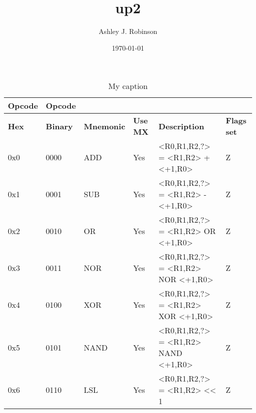 \documentclass[a4paper]{article}
\title{up2}
\author{Ashley J. Robinson}
\date{\today}
\begin{document}
\maketitle

\section{}

\begin{table}[]
    \centering
    \caption{My caption}
    \label{my-label}
    \begin{tabular}{|l|l|l|l|l|l|}
        \hline
        \textbf{Opcode}     &   \textbf{Opcode} &                       &                       &                                           &                           \\ \hline  
        \textbf{Hex}        &   \textbf{Binary} &   \textbf{Mnemonic}   &   \textbf{Use MX}     &   \textbf{Description}                    &   \textbf{Flags set}      \\ \hline  
        0x0                 &   0000            &   ADD                 &   Yes                 &   <R0,R1,R2,?> = <R1,R2> + <+1,R0>        &   Z                       \\ \hline  
        0x1                 &   0001            &   SUB                 &   Yes                 &   <R0,R1,R2,?> = <R1,R2> - <+1,R0>        &   Z                       \\ \hline  
        0x2                 &   0010            &   OR                  &   Yes                 &   <R0,R1,R2,?> = <R1,R2> OR <+1,R0>       &   Z                       \\ \hline  
        0x3                 &   0011            &   NOR                 &   Yes                 &   <R0,R1,R2,?> = <R1,R2> NOR <+1,R0>      &   Z                       \\ \hline  
        0x4                 &   0100            &   XOR                 &   Yes                 &   <R0,R1,R2,?> = <R1,R2> XOR <+1,R0>      &   Z                       \\ \hline  
        0x5                 &   0101            &   NAND                &   Yes                 &   <R0,R1,R2,?> = <R1,R2> NAND <+1,R0>     &   Z                       \\ \hline 
        0x6                 &   0110            &   LSL                 &   Yes                 &   <R0,R1,R2,?> = <R1,R2> << 1             &   Z                       \\ \hline 

\end{tabular}
\end{table}
\end{document}

